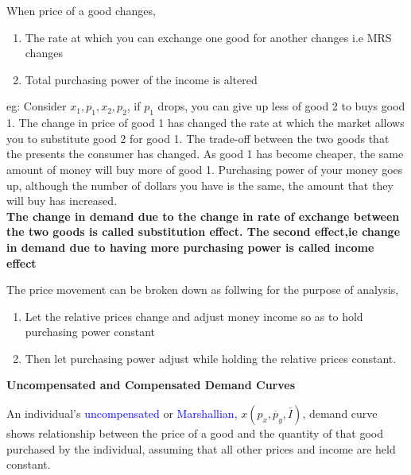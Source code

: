 \documentclass{tufte-handout}
\begin{document}
When price of a good changes,
\begin{enumerate}
		\item The rate at which you can exchange one good for another changes i.e MRS changes
		\item Total purchasing power of the income is altered
		
\end{enumerate}


eg: Consider $x_1,p_1,x_2,p_2$, if  $p_1$ drops, you can give up less of  good 2 to buys good 1. The change in price of good 1 has changed the rate at which the market allows you to substitute good 2 for good 1. The trade-off between the two goods that the presents the consumer has changed. As good 1 has become cheaper, the same amount of money will buy more of good 1. Purchasing power of your money goes up, although the number of dollars you have is the same, the amount that they will buy has increased.\\
\textbf{ The change in demand due to the change in rate of exchange between the two goods is called substitution effect. The second effect,ie change in demand due to having more purchasing power is called income effect}

The price movement can be broken down as follwing for the purpose of analysis,
\begin{enumerate}
		\item Let the relative prices change and adjust money income so as to hold purchasing power constant
		\item Then let purchasing power adjust while holding the relative prices constant.
		
\end{enumerate}

\clearpage


\textbf{\centering \large Uncompensated and Compensated Demand Curves}\\ 
\vspace{0.5cm}

\textbullet An individual's \textcolor{blue}{uncompensated} or \textcolor{blue}{Marshallian}, $x(p_x,\overline{p}_y,\overline{I})$,  demand curve shows relationship between the price of a good and the quantity of that good purchased by the individual, assuming that all other prices and income are held constant.
\end{document}
